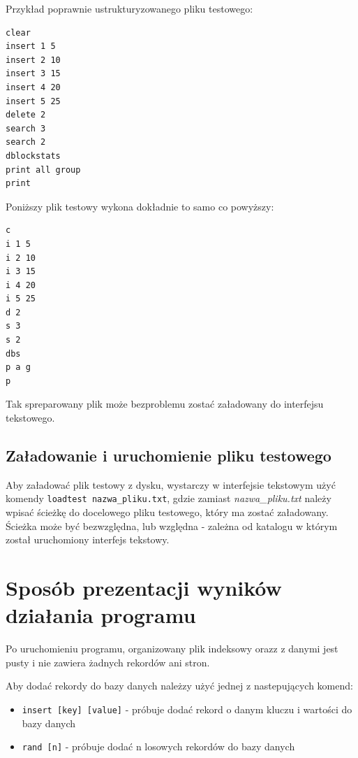 \documentclass[12pt]{article}
\begin{document}
Przykład poprawnie ustrukturyzowanego pliku testowego:

\begin{tcolorbox}[colframe=black!75, colback=white!95, title=Plik: \texttt{text.txt}]
\begin{verbatim}
clear
insert 1 5
insert 2 10
insert 3 15
insert 4 20
insert 5 25
delete 2
search 3
search 2
dblockstats
print all group
print
\end{verbatim}
\end{tcolorbox}

Poniższy plik testowy wykona dokładnie to samo co powyższy:
\begin{tcolorbox}[colframe=black!75, colback=white!95, title=Plik: \texttt{text.txt}]
\begin{verbatim}
c
i 1 5
i 2 10
i 3 15
i 4 20
i 5 25
d 2
s 3
s 2
dbs
p a g
p
\end{verbatim}
\end{tcolorbox}

Tak spreparowany plik może bezproblemu zostać załadowany do interfejsu tekstowego.
\subsection{Załadowanie i uruchomienie pliku testowego}
Aby załadować plik testowy z dysku, wystarczy w interfejsie tekstowym użyć komendy \verb!loadtest nazwa_pliku.txt!,
gdzie zamiast \emph{nazwa\_pliku.txt} należy wpisać ścieżkę do docelowego pliku testowego, który ma zostać załadowany.
Ścieżka może być bezwzględna, lub względna - zależna od katalogu w którym został uruchomiony interfejs tekstowy.

\section{Sposób prezentacji wyników działania programu}

Po uruchomieniu programu, organizowany plik indeksowy orazz z danymi jest pusty i nie zawiera żadnych rekordów ani stron.

Aby dodać rekordy do bazy danych należzy użyć jednej z nastepujących komend:

\begin{itemize}
    \item \verb!insert [key] [value]! - próbuje dodać rekord o danym kluczu i wartości do bazy danych
    \item \verb!rand [n]! - próbuje dodać n losowych rekordów do bazy danych
\end{itemize}
\end{document}
